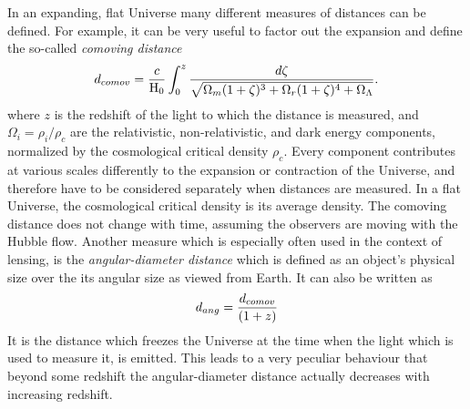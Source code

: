 In an expanding, flat Universe many different measures of distances can be
defined.  For example, it can be very useful to factor out the expansion and
define the so-called \textit{comoving distance}
%
\begin{equation}\eqlbl{d_comov}%
    d_{comov} = \frac{c}{\Ho} \int_0^{z} \frac{d\zeta}{\sqrt{\Omega_m(1+\zeta)^3
    + \Omega_r(1+\zeta)^4 + \Omega_\Lambda}}.
\end{equation}
%
where $z$ is the redshift of the light to which the distance is measured, and
$\Omega_i=\rho_i/\rho_c$ are the relativistic, non-relativistic, and dark energy
components, normalized by the cosmological critical density $\rho_c$.  Every
component contributes at various scales differently to the expansion or
contraction of the Universe, and therefore have to be considered separately when
distances are measured.  In a flat Universe, the cosmological critical density
is its average density.  The comoving distance does not change with time,
assuming the observers are moving with the Hubble flow.  Another measure which
is especially often used in the context of lensing, is the
\textit{angular-diameter distance} which is defined as an object's physical size
over the its angular size as viewed from Earth. It can also be written as
%
\begin{equation}\eqlbl{d_comov}%
    d_{ang} = \frac{d_{comov}}{(1+z)}
\end{equation}
%
It is the distance which freezes the Universe at the time when the light which
is used to measure it, is emitted.  This leads to a very peculiar behaviour that
beyond some redshift the angular-diameter distance actually decreases with
increasing redshift.

